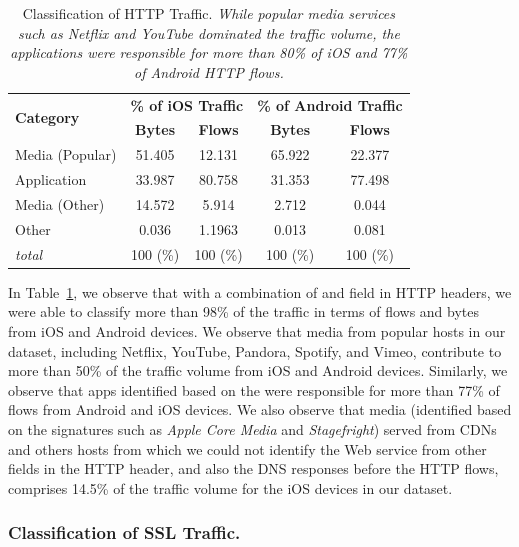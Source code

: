 \begin{table}
\centering
\begin{small}
\begin{tabular}{|p{}|c|c|c|c|}
\hline
\multirow{2}{*}{\bf Category} & \multicolumn{2}{c|}{\bf \% of iOS Traffic } &  \multicolumn{2}{c|}{\bf \% of Android Traffic } \tabularnewline
\cline{2-5}
  & {\bf Bytes}  & {\bf Flows} & {\bf Bytes} & {\bf Flows}   \tabularnewline
\hline
Media (Popular)         & 51.405  & 12.131 & 65.922 & 22.377 \tabularnewline
\hline
Application             & 33.987  & 80.758 & 31.353 & 77.498 \tabularnewline
\hline
Media (Other)           & 14.572  &  5.914 &  2.712 &  0.044 \tabularnewline
\hline
Other                   &  0.036  & 1.1963 &  0.013 &  0.081 \tabularnewline
\hline
{\em total}             & 100 (\%)& 100 (\%)& 100 (\%) & 100 (\%) \tabularnewline
\hline
\end{tabular}
\end{small}
\caption{Classification of HTTP Traffic. \emph{While popular media services such as Netflix and YouTube dominated the traffic volume, the applications were responsible for more than 80\% of iOS and 77\% of Android HTTP flows.}}
\label{tab:classify-http}
\vspace{\postfigspace}
\end{table}

In Table~\ref{tab:classify-http}, we observe that with a combination of \useragent and \httphost field in HTTP headers, we were able to classify more than 98\% of the traffic in terms of flows and bytes from iOS and Android devices.
We observe that media from popular hosts in our \mobWild dataset, including Netflix, YouTube, Pandora, Spotify, and Vimeo, contribute to more than 50\% of the traffic volume from iOS and Android devices.
Similarly, we observe that apps identified based on the \useragent  were responsible for more than 77\% of flows from Android and iOS devices. 
We also observe that media (identified based on the signatures such as \emph{Apple Core Media} and \emph{Stagefright}) served from CDNs and others hosts from which we could not identify the Web service from other fields in the HTTP header, and also the DNS responses before the HTTP flows, comprises 14.5\% of the traffic volume for the iOS devices in our dataset.

\subsubsection{Classification of SSL Traffic.}

